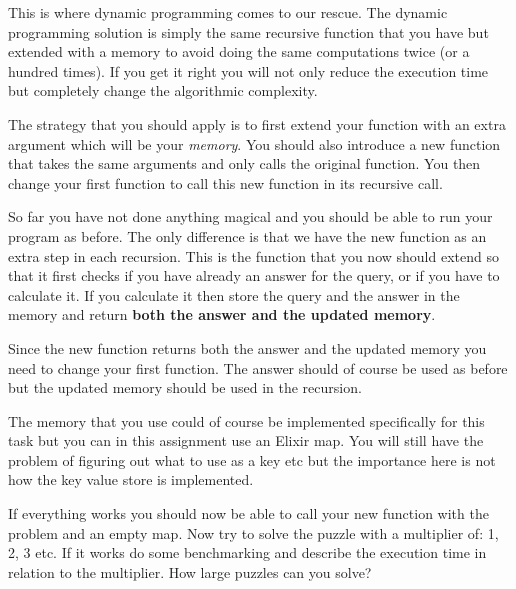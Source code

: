 \documentclass[a4paper,11pt]{article}
\begin{document}
This is where dynamic programming comes to our rescue. The dynamic
programming solution is simply the same recursive function that you
have but extended with a memory to avoid doing the same computations
twice (or a hundred times). If you get it right you will not only
reduce the execution time but completely change the algorithmic
complexity.

The strategy that you should apply is to first extend your function
with an extra argument which will be your {\em memory}. You should
also introduce a new function that takes the same arguments and only
calls the original function. You then change your first function to
call this new function in its recursive call.

So far you have not done anything magical and you should be able to run
your program as before. The only difference is that we have the new
function as an extra step in each recursion. This is the function that
you now should extend so that it first checks if you have already an
answer for the query, or if you have to calculate it. If you calculate
it then store the query and the answer in the memory and return {\bf
  both the answer and the updated memory}.

Since the new function returns both the answer and the updated memory
you need to change your first function. The answer should of course be
used as before but the updated memory should be used in the recursion.

The memory that you use could of course be implemented specifically for
this task but you can in this assignment use an Elixir map. You will
still have the problem of figuring out what to use as a key etc but
the importance here is not how the key value store is implemented.

If everything works you should now be able to call your new function
with the problem and an empty map. Now try to solve the puzzle with a
multiplier of: 1, 2, 3 etc. If it works do some benchmarking and
describe the execution time in relation to the multiplier.  How large
puzzles can you solve?
\end{document}
